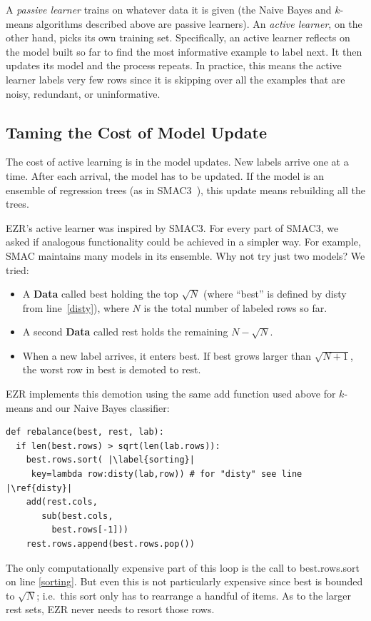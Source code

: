 \documentclass[AMA,STIX2COL]{WileyNJDv5}
\newcommand{\cls}[1]{%
  \setlength{\fboxsep}{1.5pt}%
  \colorbox{clsbg}{\sffamily\bfseries{#1}}%
}
\begin{document}
 A {\em passive learner} trains on whatever data it is given (the Naive Bayes and
 $k$-means algorithms described above are passive learners). An {\em active
learner}, on the other hand,  picks its own training set. Specifically, an active learner reflects on the
model built so far to find the  most informative    example to label next. 
It then updates its model and the process repeats. In practice,
this means the active learner labels very few rows since it is 
skipping over all the  examples that are noisy, redundant, or
uninformative.  

\subsection{Taming the Cost of Model Update}

The cost of active learning is in the model updates. New labels arrive
one at a time. After each arrival, the model has to be updated. If
the model is an ensemble of regression trees (as in
SMAC3~\cite{hutter2011sequential}), this update means rebuilding all the trees.

EZR's active learner 
was inspired by SMAC3. For every part of SMAC3, we asked if   analogous
functionality could be achieved in a simpler way.
For example,   SMAC maintains many models in its ensemble.
Why not try just two models?  We tried:
\begin{itemize}
\item A \cls{Data} called \textsf{best} holding the top $\sqrt{N}$
(where ``best'' is defined by \textsf{disty} from line~\ref{disty}), where $N$ is the total number of
labeled rows so far.
\item A second \cls{Data} called \textsf{rest} holds the
remaining $N - \sqrt{N}$.
\item When a new label arrives, it enters \textsf{best}. If
  \textsf{best} grows larger than  $\sqrt{N+1}$, the worst row in
\textsf{best} is demoted to \textsf{rest}.
\end{itemize}
EZR implements this demotion using the same \textsf{add} function used
above for $k$-means and our Naive Bayes classifier:
\begin{lstlisting}
def rebalance(best, rest, lab): 
  if len(best.rows) > sqrt(len(lab.rows)):
    best.rows.sort( |\label{sorting}|
     key=lambda row:disty(lab,row)) # for "disty" see line |\ref{disty}|
    add(rest.cols, 
       sub(best.cols,
         best.rows[-1]))
    rest.rows.append(best.rows.pop())
\end{lstlisting}
The only computationally expensive part of this loop
is the call to \textsf{best.rows.sort} on line \ref{sorting}. But even this
is not particularly expensive since \textsf{best} is bounded to $\sqrt{N}$;
i.e.\ 
this sort only has to rearrange a handful of items.  As to the larger \textsf{rest} sets,  EZR never needs to resort those rows.
\end{document}
